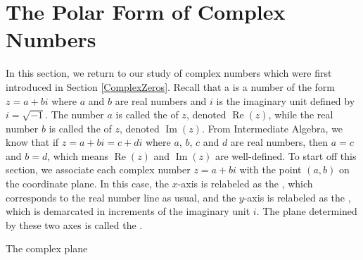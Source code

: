 \section{The Polar Form of Complex Numbers}

\label{PolarComplex}

In this section, we return to our study of complex numbers which were first introduced in Section \ref{ComplexZeros}.  Recall that a  is a number of the form $z = a + bi$ where $a$ and $b$ are real numbers and $i$ is the imaginary unit defined by $i = \sqrt{-1}$. The number $a$ is called the    of $z$, denoted  $\operatorname{Re}(z)$, while the real number $b$ is called the   of $z$, denoted $\operatorname{Im}(z)$.  From Intermediate Algebra, we know that if $z = a + bi = c + di$ where $a$, $b$, $c$ and $d$ are real numbers, then $a = c$ and $b = d$, which means $\operatorname{Re}(z)$ and $\operatorname{Im}(z)$ are well-defined. To start off this section, we associate each complex number $z = a+bi$ with the point $(a,b)$ on the coordinate plane.  In this case, the $x$-axis is relabeled as the , which corresponds to the real number line as usual,  and the $y$-axis is relabeled as the , which is demarcated in increments of the imaginary unit $i$.  The plane determined by these two axes is called the .


\medskip

\noindent\begin{minipage}{\textwidth}
\begin{center}
\end{center}
\captionsetup{type=figure}
\caption{The complex plane}\label{fig:complexplane}
\end{minipage}

